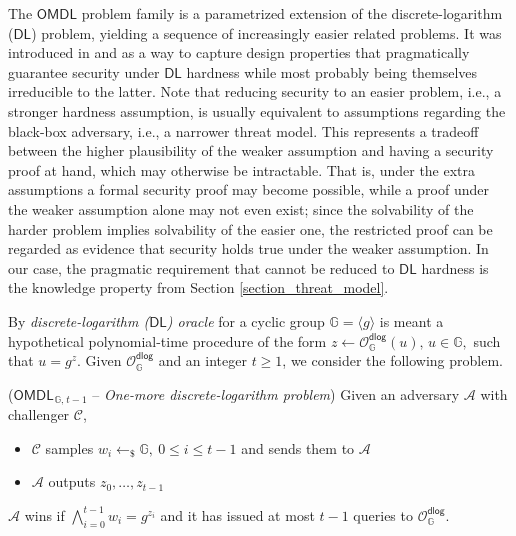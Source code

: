 \documentclass{iacrtrans}
\begin{document}
The $\mathsf{OMDL}$ problem family
is a parametrized extension of
the discrete-logarithm ($\mathsf{DL}$) problem,
yielding a sequence of increasingly easier related problems.
It was introduced in
\cite{paper_bellare_palacio} and
\cite{paper_bellare_omdl}
as a way to capture design properties
that pragmatically guarantee security under
$\mathsf{DL}$ hardness
while most probably being themselves irreducible to the latter.
Note that reducing security to an easier problem,
i.e., a stronger hardness assumption,
is usually equivalent to assumptions
regarding the black-box adversary,
i.e., a narrower threat model.
This represents a tradeoff between the higher plausibility
of the weaker assumption
and having a security proof at hand,
which may otherwise be intractable.
That is, under the extra assumptions
a formal security proof may become possible,
while a proof under the weaker
assumption alone may not even exist;
since the solvability of the harder problem
implies solvability of the easier one,
the restricted proof can be regarded as
evidence that security holds
true under the weaker assumption.
In our case, the pragmatic requirement
that cannot be reduced to $\mathsf{DL}$ hardness
is the knowledge property
from Section \ref{section_threat_model}.

By \textit{discrete-logarithm \textup{($\mathsf{DL}$)} oracle}
for a cyclic group $\mathbb{G} = \langle g \rangle$
is meant a hypothetical polynomial-time procedure of the form
$z \leftarrow \mathcal{O}_{\mathbb{G}}^{\mathsf{dlog}}(u),
\hspace{2pt} u \in \mathbb{G},$
such that
$u = g ^ z$.
Given $\mathcal{O}_{\mathbb{G}}^{\mathsf{dlog}}$
and an integer $t \ge 1$,
we consider the following problem.

\begin{attack_game}\label{omdl_attack}
\vspace{3pt}
($\mathsf{OMDL}_{\hspace{1pt}\mathbb{G},\hspace{1pt} t-1}$ --
\textit{One-more discrete-logarithm problem})
Given an adversary $\mathcal{A}$ with challenger $\mathcal{C}$,\vspace{2pt}
\begin{itemize}[label=$\circ$,leftmargin=17pt]
	\item
		$\mathcal{C}$ samples $w_i \leftarrow_\$ \mathbb{G},
		\ 0 \le i \le t-1$
		and sends them to $\mathcal{A}$\vspace{5pt}
	\item
		$\mathcal{A}$ outputs $z_0, \dots, z_{t-1}$\vspace{2.5pt}
\end{itemize}
\hspace*{0pt}%
\begin{minipage}{\dimexpr\textwidth-\parindent\relax}%
	\hspace{8pt}$\mathcal{A}$ wins if\hspace{0pt}
	$\bigwedge\limits_{i=0}^{t-1} w_i = g^{z_i}$
	and it has issued at most $t-1$ queries to
	$\mathcal{O}_{\mathbb{G}}^{\mathsf{dlog}}$.
\end{minipage}%
\vspace{3.0pt}
\end{attack_game}
\end{document}
